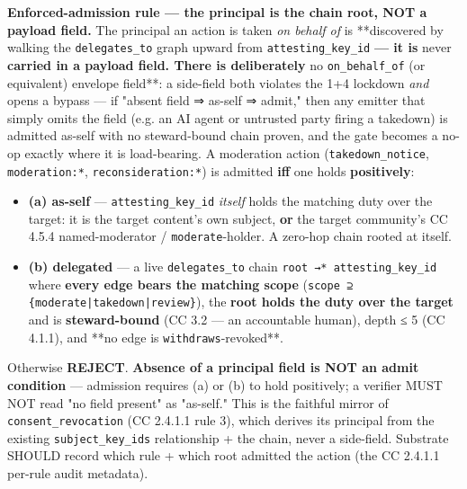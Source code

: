 \documentclass[11pt]{article}
\begin{document}
\textbf{Enforced-admission rule — the principal is the chain root, NOT a payload field.} The principal an action is taken \textit{on behalf of} is **discovered by walking the \texttt{delegates\_to} graph upward from \texttt{attesting\_key\_id}\textbf{ — it is }never\textbf{ carried in a payload field. There is deliberately }no \texttt{on\_behalf\_of} (or equivalent) envelope field**: a side-field both violates the 1+4 lockdown \textit{and} opens a bypass — if "absent field ⇒ as-self ⇒ admit," then any emitter that simply omits the field (e.g. an AI agent or untrusted party firing a takedown) is admitted as-self with no steward-bound chain proven, and the gate becomes a no-op exactly where it is load-bearing. A moderation action (\texttt{takedown\_notice}, \texttt{moderation:*}, \texttt{reconsideration:*}) is admitted \textbf{iff} one holds \textbf{positively}:


\begin{itemize}\setlength\itemsep{0pt}
\item \textbf{(a) as-self} — \texttt{attesting\_key\_id} \textit{itself} holds the matching duty over the target: it is the target content's own subject, \textbf{or} the target community's CC 4.5.4 named-moderator / \texttt{moderate}-holder. A zero-hop chain rooted at itself.
\item \textbf{(b) delegated} — a live \texttt{delegates\_to} chain \texttt{root →* attesting\_key\_id} where \textbf{every edge bears the matching scope} (\texttt{scope ⊇ \{moderate|takedown|review\}}), the \textbf{root holds the duty over the target} and is \textbf{steward-bound} (CC 3.2 — an accountable human), depth ≤ 5 (CC 4.1.1), and **no edge is \texttt{withdraws}-revoked**.
\end{itemize}


Otherwise \textbf{REJECT}. \textbf{Absence of a principal field is NOT an admit condition} — admission requires (a) or (b) to hold positively; a verifier MUST NOT read "no field present" as "as-self." This is the faithful mirror of \texttt{consent\_revocation} (CC 2.4.1.1 rule 3), which derives its principal from the existing \texttt{subject\_key\_ids} relationship + the chain, never a side-field. Substrate SHOULD record which rule + which root admitted the action (the CC 2.4.1.1 per-rule audit metadata).
\end{document}
